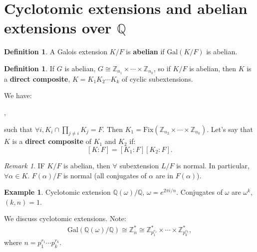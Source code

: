 \documentclass[9pt,reqno,twoside]{amsbook}
\theoremstyle{plain}
\numberwithin{section}{chapter}
\numberwithin{equation}{chapter}
\theoremstyle{definition}
\newtheorem{Def}[theorem]{Definition}
\newtheorem{Ex}[theorem]{Example}
\theoremstyle{remark}
\newtheorem{rem}[theorem]{Remark}
\theoremstyle{plain}
\newcommand{\z}{\mathbb{Z}}
\newcommand{\Q}{\mathbb{Q}}
\newcommand{\bee}{\begin{equation}\begin{aligned}}
\newcommand{\eee}{\end{aligned}\end{equation}}
\newcommand{\gal}{\mathrm{Gal}}
\newcommand{\fix}{\mathrm{Fix}}
\begin{document}
  
  
  
  
 
 
 
 \section{Cyclotomic extensions and abelian extensions over $\Q$}
 
 \begin{Def}
 A Galois extension $K/F$ is \textbf{abelian} if $\gal(K/F)$ is abelian. 
 \end{Def}
 
 \begin{Def}
 If $G$ is abelian, $G \cong \z_{n_1} \times \cdots \times \z_{n_k}$, so if $K/F$ is abelian, then $K$ is a \textbf{direct composite}, $K = K_1K_2\cdots K_k$ of cyclic subextensions. 

 
 We have:
 \begin{center}
 ,
 \end{center}
 such that $\forall i, K_i \cap \prod_{j \neq i}K_j = F$. Then $K_1 = \fix(\z_{n_2}\times \cdots \times \z_{n_k})$. Let's say that $K$ is a \textbf{direct composite} of $K_1$ and $K_2$ if:
$$
 [K:F] = [K_1:F][K_2:F].
$$
 
  \end{Def}
  
  \begin{rem}
  IF $K/F$ is abelian, then $\forall$ subextension $L/F$ is normal. In particular, $\forall \alpha \in K$. $F(\alpha)/F$ is normal (all conjugates of $\alpha$ are in $F(\alpha)$). 
  \end{rem}
  
  \begin{Ex}
  Cyclotomic extension $\Q(\omega)/\Q$, $\omega = e^{2\pi i/n}$. Conjugates of $\omega$ are $\omega^k$, $(k,n) = 1$. 
  \end{Ex}



We discuss cyclotomic extensions. Note:
\bee
\gal(\Q(\omega)/\Q) \cong \z_n^* \cong \z_{p_1^{r_1}}^* \times \cdots \times \z_{p_k^{r_k}}^*,
\eee
where $n = p_1^{r_1}\cdots p_k^{r_k}$. 
\end{document}
